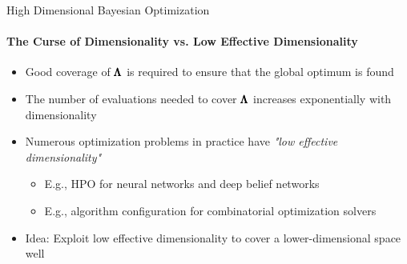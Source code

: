 \begin{frame}[c]{High Dimensional Bayesian Optimization}
\framesubtitle{The Curse of Dimensionality vs. Low Effective Dimensionality}
\begin{itemize}
    \item Good coverage of $\pmb{\Lambda}$ is required to ensure that the global optimum is found
    \item The number of evaluations needed to cover $\pmb{\Lambda}$ increases exponentially with dimensionality
    \item Numerous optimization problems in practice have \emph{"low effective dimensionality"}
    \begin{itemize}
        \item E.g., HPO for neural networks and deep belief networks
        \item E.g., algorithm configuration for combinatorial optimization solvers 
    \end{itemize}
\pause
\medskip
    \item Idea: Exploit low effective dimensionality to cover a lower-dimensional space well
\end{itemize}

\end{frame}

